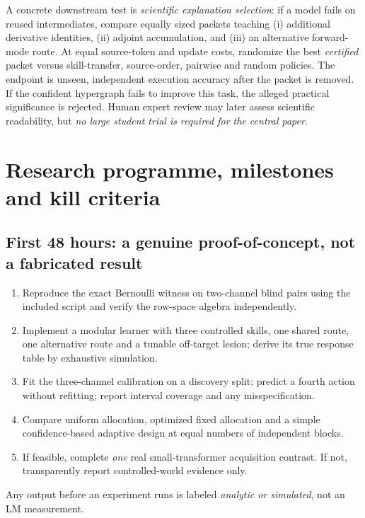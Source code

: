 \documentclass[11pt,a4paper]{article}
\theoremstyle{definition}\newtheorem{definition}[theorem]{Definition}
\theoremstyle{remark}\newtheorem{remark}[theorem]{Remark}
\begin{document}
A concrete downstream test is \emph{scientific explanation selection}: if a model fails on reused intermediates, compare equally sized packets teaching (i) additional derivative identities, (ii) adjoint accumulation, and (iii) an alternative forward-mode route. At equal source-token and update costs, randomize the best \emph{certified} packet versus skill-transfer, source-order, pairwise and random policies. The endpoint is unseen, independent execution accuracy after the packet is removed. If the confident hypergraph fails to improve this task, the alleged practical significance is rejected. Human expert review may later assess scientific readability, but \emph{no large student trial is required for the central paper}.

\section{Research programme, milestones and kill criteria}\label{sec:plan}
\subsection{First 48 hours: a genuine proof-of-concept, not a fabricated result}
\begin{enumerate}
\item Reproduce the exact Bernoulli witness on two-channel blind pairs using the included script and verify the row-space algebra independently.
\item Implement a modular learner with three controlled skills, one shared route, one alternative route and a tunable off-target lesion; derive its true response table by exhaustive simulation.
\item Fit the three-channel calibration on a discovery split; predict a fourth action without refitting; report interval coverage and any misspecification.
\item Compare uniform allocation, optimized fixed allocation and a simple confidence-based adaptive design at equal numbers of independent blocks.
\item If feasible, complete \emph{one} real small-transformer acquisition contrast. If not, transparently report controlled-world evidence only.
\end{enumerate}
Any output before an experiment runs is labeled \emph{analytic or simulated}, not an LM measurement.
\end{document}

